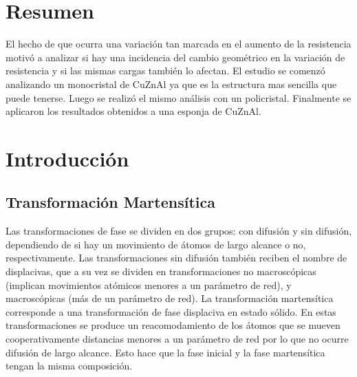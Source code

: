 \documentclass[a4paper,12pt,fleqn,twoside,openany]{book}
\begin{document}

\tableofcontents

\chapter*{Resumen}


El hecho de que ocurra una variación tan marcada en el aumento de la resistencia motivó a analizar si hay una incidencia del cambio geométrico en la variación de resistencia y si las mismas cargas también lo afectan. El estudio se comenzó analizando un monocristal de CuZnAl ya que es la estructura mas sencilla que puede tenerse. Luego se realizó el mismo análisis con un policristal. Finalmente se aplicaron los resultados obtenidos a una esponja de CuZnAl.

\chapter{Introducción}

\section{Transformación Martensítica}

Las transformaciones de fase se dividen en dos grupos:  con difusión y sin difusión, dependiendo de si hay un movimiento de átomos de largo alcance o no,
respectivamente. Las transformaciones sin difusión también reciben el nombre de displacivas, que a su vez se dividen en transformaciones no macroscópicas
(implican movimientos atómicos menores a un parámetro de red), y macroscópicas (más de un parámetro de red).
La transformación martensítica corresponde a una transformación de fase displaciva en estado sólido. En estas transformaciones se produce un reacomodamiento de los átomos que se mueven cooperativamente distancias menores a un parámetro de red 
por lo que no ocurre difusión de largo alcance. Esto hace que la fase inicial y la fase martensítica tengan la misma composición. 


\end{document}
